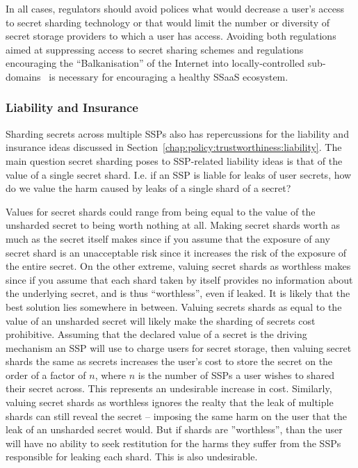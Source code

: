 In all cases, regulators should avoid polices what would decrease a
user's access to secret sharding technology or that would limit the
number or diversity of secret storage providers to which a user has
access. Avoiding both regulations aimed at suppressing access to
secret sharing schemes and regulations encouraging the
``Balkanisation'' of the Internet into locally-controlled
sub-domains~\cite{lee2014} is necessary for encouraging a healthy
SSaaS ecosystem.

\subsubsection{Liability and Insurance}

Sharding secrets across multiple SSPs also has repercussions for the
liability and insurance ideas discussed in
Section~\ref{chap:policy:trustworthiness:liability}. The main question
secret sharding poses to SSP-related liability ideas is that of the
value of a single secret shard. I.e. if an SSP is liable for leaks of
user secrets, how do we value the harm caused by leaks of a single
shard of a secret?

Values for secret shards could range from being equal to the value of
the unsharded secret to being worth nothing at all. Making secret
shards worth as much as the secret itself makes since if you assume
that the exposure of any secret shard is an unacceptable risk since it
increases the risk of the exposure of the entire secret. On the other
extreme, valuing secret shards as worthless makes since if you assume
that each shard taken by itself provides no information about the
underlying secret, and is thus ``worthless'', even if leaked. It is
likely that the best solution lies somewhere in between. Valuing
secrets shards as equal to the value of an unsharded secret will
likely make the sharding of secrets cost prohibitive. Assuming that
the declared value of a secret is the driving mechanism an SSP will
use to charge users for secret storage, then valuing secret shards the
same as secrets increases the user's cost to store the secret on the
order of a factor of $n$, where $n$ is the number of SSPs a user
wishes to shared their secret across. This represents an undesirable
increase in cost. Similarly, valuing secret shards as worthless
ignores the realty that the leak of multiple shards can still reveal
the secret -- imposing the same harm on the user that the leak of an
unsharded secret would. But if shards are ''worthless'', than the user
will have no ability to seek restitution for the harms they suffer
from the SSPs responsible for leaking each shard. This is also
undesirable.

